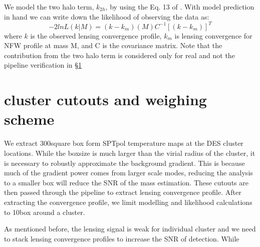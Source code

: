 We model the two halo term, $k_{2h}$, by using the Eq. 13 of .
With model prediction in hand we can write down the likelihood of observing the data as:
\begin{equation}
-2 ln L (k | M) = (k - k_{m})(M) C^{-1} [(k - k_{m})]^{T}
\end{equation}
where $k$ is the observed lensing convergence profile, $k_{m}$ is lensing convergence for NFW profile at mass M, and C is the covariance matrix. 
Note that the contribution from the two halo term is considered only for real and not the pipeline verification in \S\ref{}

\section{cluster cutouts and weighing scheme}

We extract 300\arcmin square box form SPTpol temperature maps at the DES cluster locations. 
While the boxsize is much larger than the virial radius of the cluster, it is necessary to robustly approximate the background gradient. 
This is because much of the gradient power comes from larger scale modes, reducing the analysis to a smaller box will reduce the SNR of the mass estimation. 
These cutouts are then passed through the pipeline to extract lensing convergence profile. 
After extracting the convergence profile, we limit modelling and likelihood calculations to 10\arcmin box around a cluster.

As mentioned before, the lensing signal is weak for individual cluster and we need to stack lensing convergence profiles to increase the SNR of detection.
While

